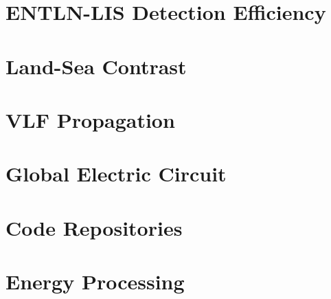 \documentclass [11pt, twoside] {uwthesis}[2012/06/19]
\begin{document}

\chapter{ENTLN-LIS Detection Efficiency}
\label{thesis:chapter:entln-lis}




\chapter{Land-Sea Contrast}
\label{thesis:chapter:landsea}




\chapter{VLF Propagation}
\label{thesis:chapter:prop}




 
\chapter{Global Electric Circuit}
\label{thesis:chapter:gec}



%
%





%
%

\appendix
\raggedbottom\sloppy
 

\chapter{Code Repositories}
\label{thesis:appendix:code}




\chapter{Energy Processing}
\label{thesis:appendix:energy}
\end{document}
